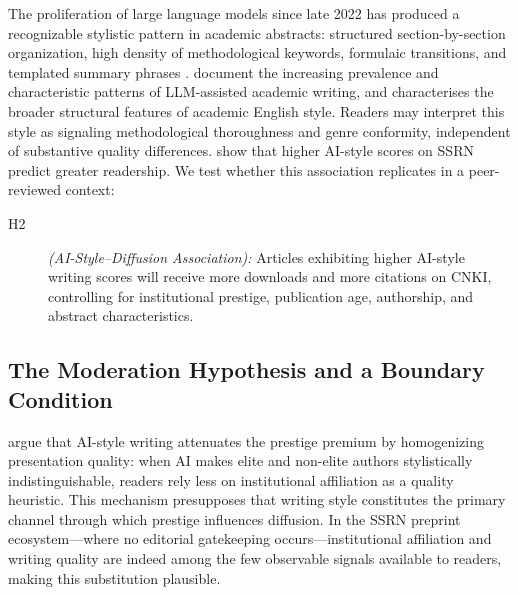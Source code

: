 \documentclass[12pt,a4paper]{article}
\begin{document}
The proliferation of large language models since late 2022 has produced
a recognizable stylistic pattern in academic abstracts: structured
section-by-section organization, high density of methodological keywords,
formulaic transitions, and templated summary phrases
\citep{Liang2024,Biber2016}.
\citet{Liang2024} document the increasing prevalence and characteristic
patterns of LLM-assisted academic writing, and \citet{Biber2016}
characterises the broader structural features of academic English style.
Readers may interpret this style as signaling methodological
thoroughness and genre conformity, independent of substantive quality
differences.
\citet{JoLi2026} show that higher AI-style scores on SSRN predict
greater readership.
We test whether this association replicates in a peer-reviewed context:
\begin{description}
  \item[H2] \textit{(AI-Style--Diffusion Association):}
  Articles exhibiting higher AI-style writing scores will receive
  more downloads and more citations on CNKI, controlling for
  institutional prestige, publication age, authorship, and abstract
  characteristics.
\end{description}

\subsection{The Moderation Hypothesis and a Boundary Condition}

\citet{JoLi2026} argue that AI-style writing attenuates the prestige
premium by homogenizing presentation quality: when AI makes elite and
non-elite authors stylistically indistinguishable, readers rely less
on institutional affiliation as a quality heuristic.
This mechanism presupposes that writing style constitutes the primary
channel through which prestige influences diffusion.
In the SSRN preprint ecosystem---where no editorial gatekeeping
occurs---institutional affiliation and writing quality are indeed
among the few observable signals available to readers, making this
substitution plausible.
\end{document}
